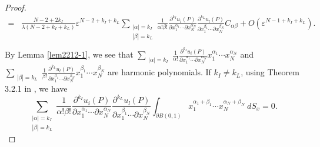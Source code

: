 \documentclass[11pt,reqno]{article}
\numberwithin{equation}{section}
\newcommand\e\varepsilon
\begin{document}
\begin{proof}
\begin{equation}
\begin{aligned}
               =&\frac{N-2+2{ k_I}}{\lambda (N-2+k_I+k_L) }\e^{N-2+{ k_I}+{ k_L}}	\sum_{\substack{|\alpha|={ k_I}\\
           |\beta|={ k_L}}}\frac{1}{\alpha!\beta!}\frac{\partial^{{ k_I}} u_i (P)}{\partial x_{1}^{\alpha_1}\cdots\partial x_{N}^{\alpha_N}}\frac{\partial^{{ k_L}} u_l (P)}{\partial x_{1}^{\beta_1}\cdots\partial x_{N}^{\beta_N}} C_{\alpha\beta}
            +O(\e^{N-1+{ k_I}+{ k_L}}).\\
              \end{aligned}
    \end{equation}
    By Lemma \ref{lem2212-1}, we see that $\sum_{\substack{|\alpha|={ k_I}}}\frac{1}{\alpha!}\frac{\partial^{{ k_I}} u_i (P)}{\partial x_{1}^{\alpha_1}\cdots\partial x_{N}^{\alpha_N}}x_1^{\alpha_1}\cdots x_N^{\alpha_N}$ and $\sum_{\substack{
           |\beta|={ k_L}}}\frac{1}{\beta!}\frac{\partial^{{ k_L}} u_l (P)}{\partial x_{1}^{\beta_1}\cdots\partial x_{N}^{\beta_N}}x_1^{\beta_1}\cdots x_N^{\beta_N} $ are harmonic polynomials. If ${ k_I}\neq { k_L}$,
        using Theorem 3.2.1 in  \cite{Groemer_1996}, we have 
        \begin{equation}
            \sum_{\substack{|\alpha|={ k_I}\\
           |\beta|={ k_L}}}\frac{1}{\alpha!\beta!}\frac{\partial^{{ k_I}} u_i (P)}{\partial x_{1}^{\alpha_1}\cdots\partial x_{N}^{\alpha_N}}\frac{\partial^{{ k_L}} u_l (P)}{\partial x_{1}^{\beta_1}\cdots\partial x_{N}^{\beta_N}} \int_{\partial B(0,1)} x_{1}^{\alpha_1+\beta_1}\cdots x_{N}^{\alpha_N+\beta_N} \ d S_x=0.

\end{equation}
\end{proof}
\end{document}
